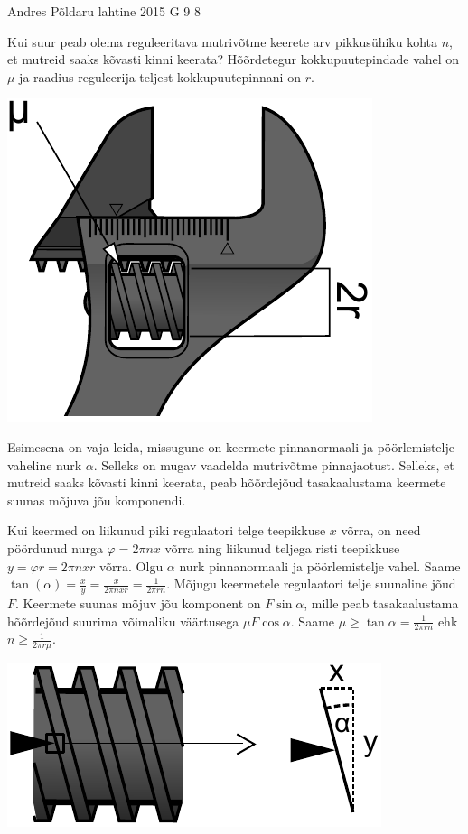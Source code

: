 {Andres Põldaru} %
{lahtine} %
{2015} %
{G 9} %
{8} %
{
\ifStatement
Kui suur peab olema reguleeritava mutrivõtme keerete arv pikkusühiku kohta $n$, et mutreid saaks kõvasti kinni keerata? Hõõrdetegur kokkupuutepindade vahel on $\mu$ ja raadius reguleerija teljest kokkupuutepinnani on $r$.
\begin{center}%
\includegraphics[width=0.4\linewidth]{2015-lahg-09-mutriv6ti_joonis}%
\end{center}
\fi


\ifHint
Esimesena on vaja leida, missugune on keermete pinnanormaali ja pöörlemistelje vaheline nurk $\alpha$. Selleks on mugav vaadelda mutrivõtme pinnajaotust. Selleks, et mutreid saaks kõvasti kinni keerata, peab hõõrdejõud tasakaalustama keermete suunas mõjuva jõu komponendi.
\fi


\ifSolution
Kui keermed on liikunud piki regulaatori telge teepikkuse $x$ võrra, on need pöördunud nurga $\varphi=2\pi nx$ võrra ning liikunud teljega risti teepikkuse $y=\varphi r=2\pi nxr$ võrra. Olgu $\alpha$ nurk pinnanormaali ja pöörlemistelje vahel. Saame $\tan(\alpha)=\frac{x}{y}=\frac{x}{2\pi nxr}=\frac{1}{2\pi rn}$. Mõjugu keermetele regulaatori telje suunaline jõud $F$. Keermete suunas mõjuv jõu komponent on $F\sin\alpha$, mille peab tasakaalustama hõõrdejõud suurima võimaliku väärtusega $\mu F\cos\alpha$. Saame $\mu\geq\tan\alpha=\frac{1}{2\pi rn}$ ehk $n\ge\frac{1}{2\pi r\mu}$.

\begin{center}
\includegraphics[width=0.5\linewidth]{2015-lahg-09-mutriv6ti_lahendus.pdf}
\end{center}
\fi


}
